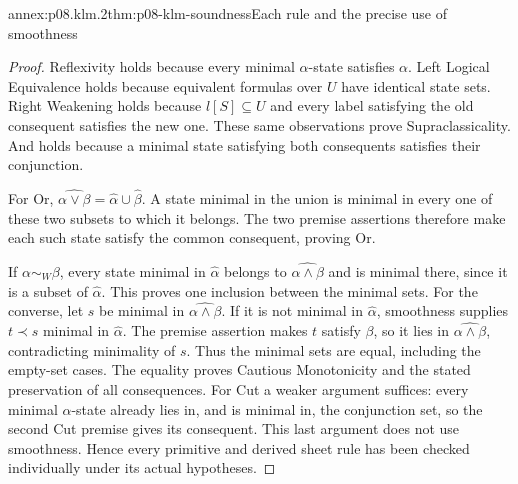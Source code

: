 \begin{annexitem}{annex:p08.klm.2}{thm:p08-klm-soundness}{Each rule and the precise use of smoothness}
\begin{proof}
Reflexivity holds because every minimal \(\alpha\)-state satisfies
\(\alpha\). Left Logical Equivalence holds because equivalent formulas
over \(U\) have identical state sets. Right Weakening holds because
\(l[S]\subseteq U\) and every label satisfying the old consequent
satisfies the new one. These same observations prove Supraclassicality.
And holds because a minimal state satisfying both consequents satisfies
their conjunction.

For Or, \(\widehat{\alpha\vee\beta}=\widehat\alpha\cup\widehat\beta\).
A state minimal in the union is minimal in every one of these two
subsets to which it belongs. The two premise assertions therefore make
each such state satisfy the common consequent, proving Or.

If \(\alpha\sim_W\beta\), every state minimal in
\(\widehat\alpha\) belongs to \(\widehat{\alpha\wedge\beta}\)
and is minimal there, since it is a subset of \(\widehat\alpha\).
This proves one inclusion between the minimal sets. For the converse,
let \(s\) be minimal in \(\widehat{\alpha\wedge\beta}\).
If it is not minimal in \(\widehat\alpha\), smoothness supplies
\(t\prec s\) minimal in \(\widehat\alpha\). The premise assertion
makes \(t\) satisfy \(\beta\), so it lies in
\(\widehat{\alpha\wedge\beta}\), contradicting minimality of \(s\).
Thus the minimal sets are equal, including the empty-set cases.
The equality proves Cautious Monotonicity and the stated preservation
of all consequences. For Cut a weaker argument suffices: every minimal
\(\alpha\)-state already lies in, and is minimal in, the conjunction
set, so the second Cut premise gives its consequent. This last argument
does not use smoothness. Hence every primitive and derived sheet rule
has been checked individually under its actual hypotheses.
\end{proof}
\end{annexitem}


